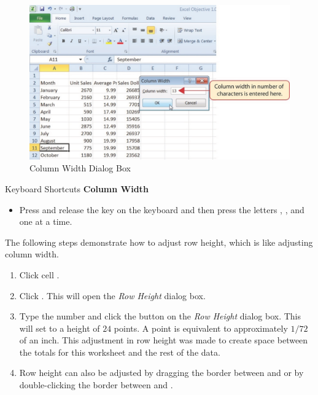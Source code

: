 \begin{figure}[H]
	\centering
	\includegraphics[width=\maxwidth{.95\linewidth}]{gfx/ch01_fig24}
	\caption{Column Width Dialog Box}
	\label{01:fig24}
\end{figure}

\begin{center}
	\begin{shtcutbox}{Keyboard Shortcuts}
		\textbf{Column Width}
		\\
		\begin{itemize}
			\setlength{\itemsep}{0pt}
			\setlength{\parskip}{0pt}
			\setlength{\parsep}{0pt}
			
			\item Press and release the  key on the keyboard and then press the letters , , and  one at a time.
			
		\end{itemize}
	\end{shtcutbox}
\end{center}

The following steps demonstrate how to adjust row height, which is like adjusting column width.

\begin{enumerate}
	\item Click cell .
	\item Click . This will open the \textit{Row Height} dialog box.
	\item Type the number  and click the  button on the \textit{Row Height} dialog box. This will set  to a height of $ 24 $ points. A point is equivalent to approximately $ 1/72 $ of an inch. This adjustment in row height was made to create space between the totals for this worksheet and the rest of the data.
	\item Row height can also be adjusted by dragging the border between  and  or by double-clicking the border between  and .
\end{enumerate}

